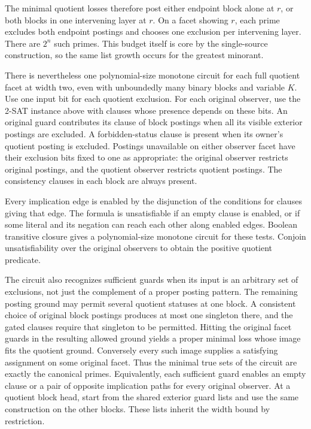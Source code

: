 The minimal quotient losses therefore post either
endpoint block alone at $r$, or both blocks in
one intervening layer at $r$. On a facet showing
$r$, each prime excludes both endpoint postings
and chooses one exclusion per intervening layer.
There are $2^n$ such primes. This budget itself
is core by the single-source construction, so
the same list growth occurs for the greatest
minorant.

There is nevertheless one polynomial-size monotone
circuit for each full quotient facet at width two,
even with unboundedly many binary blocks and variable
$K$. Use one input bit for each quotient exclusion.
For each original observer, use the 2-SAT instance
above with clauses whose presence depends on these
bits. An original guard contributes its clause of
block postings when all its visible exterior postings
are excluded. A forbidden-status clause is present
when its owner's quotient posting is excluded.
Postings unavailable on either observer facet have
their exclusion bits fixed to one as appropriate:
the original observer restricts original postings,
and the quotient observer restricts quotient postings.
The consistency clauses in each block are always
present.

Every implication edge is enabled by the disjunction
of the conditions for clauses giving that edge. The
formula is unsatisfiable if an empty clause is
enabled, or if some literal and its negation can
reach each other along enabled edges. Boolean
transitive closure gives a polynomial-size monotone
circuit for these tests. Conjoin unsatisfiability
over the original observers to obtain the positive
quotient predicate.

The circuit also recognizes sufficient guards when
its input is an arbitrary set of exclusions, not
just the complement of a proper posting pattern.
The remaining posting ground may permit several
quotient statuses at one block. A consistent choice
of original block postings produces at most one
singleton there, and the gated clauses require
that singleton to be permitted. Hitting the
original facet guards in the resulting allowed
ground yields a proper minimal loss whose image
fits the quotient ground. Conversely every such
image supplies a satisfying assignment on some
original facet. Thus the minimal true sets of the
circuit are exactly the canonical primes. Equivalently,
each sufficient guard enables an empty clause or
a pair of opposite implication paths for every
original observer. At a quotient block head, start
from the shared exterior guard lists and use the
same construction on the other blocks. These
lists inherit the width bound by restriction.

